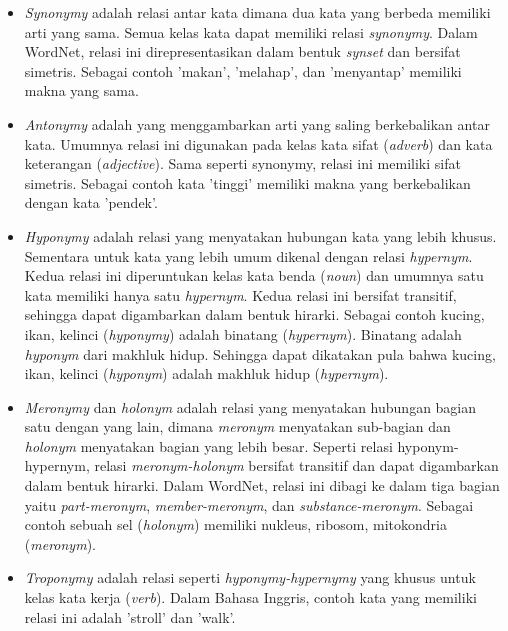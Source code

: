 \begin{itemize}
  \item \textit{Synonymy} adalah relasi antar kata dimana dua kata yang berbeda memiliki arti yang sama. Semua kelas kata dapat memiliki relasi \textit{synonymy}. Dalam WordNet, relasi ini direpresentasikan dalam bentuk \textit{synset} dan bersifat simetris. Sebagai contoh 'makan', 'melahap', dan 'menyantap' memiliki makna yang sama.
  \item \textit{Antonymy} adalah yang menggambarkan arti yang saling berkebalikan antar kata. Umumnya relasi ini digunakan pada kelas kata sifat (\textit{adverb}) dan kata keterangan (\textit{adjective}). Sama seperti synonymy, relasi ini memiliki sifat simetris. Sebagai contoh kata 'tinggi' memiliki makna yang berkebalikan dengan kata 'pendek'.
  \item \textit{Hyponymy} adalah relasi yang menyatakan hubungan kata yang lebih khusus. Sementara untuk kata yang lebih umum dikenal dengan relasi \textit{hypernym}. Kedua relasi ini diperuntukan kelas kata benda (\textit{noun}) dan umumnya satu kata memiliki hanya satu \textit{hypernym}. Kedua relasi ini bersifat transitif, sehingga dapat digambarkan dalam bentuk hirarki. Sebagai contoh kucing, ikan, kelinci (\textit{hyponymy}) adalah binatang (\textit{hypernym}). Binatang adalah \textit{hyponym} dari makhluk hidup. Sehingga dapat dikatakan pula bahwa kucing, ikan, kelinci (\textit{hyponym}) adalah makhluk hidup (\textit{hypernym}).
  \item \textit{Meronymy} dan \textit{holonym} adalah relasi yang menyatakan hubungan bagian satu dengan yang lain, dimana \textit{meronym} menyatakan sub-bagian dan \textit{holonym} menyatakan bagian yang lebih besar. Seperti relasi hyponym-hypernym, relasi \textit{meronym-holonym} bersifat transitif dan dapat digambarkan dalam bentuk hirarki. Dalam WordNet, relasi ini dibagi ke dalam tiga bagian yaitu \textit{part-meronym}, \textit{member-meronym}, dan \textit{substance-meronym}. Sebagai contoh sebuah sel (\textit{holonym}) memiliki nukleus, ribosom, mitokondria (\textit{meronym}).
  \item \textit{Troponymy} adalah relasi seperti \textit{hyponymy-hypernymy} yang khusus untuk kelas kata kerja (\textit{verb}). Dalam Bahasa Inggris, contoh kata yang memiliki relasi ini adalah 'stroll' dan 'walk'.
\end{itemize}

